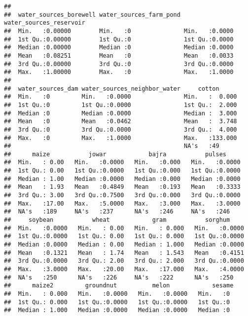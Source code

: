 \documentclass[
]{article}
\begin{document}
\begin{verbatim}
##                                                                               
##  water_sources_borewell water_sources_farm_pond water_sources_reservoir
##  Min.   :0.00000        Min.   :0               Min.   :0.0000         
##  1st Qu.:0.00000        1st Qu.:0               1st Qu.:0.0000         
##  Median :0.00000        Median :0               Median :0.0000         
##  Mean   :0.08251        Mean   :0               Mean   :0.0033         
##  3rd Qu.:0.00000        3rd Qu.:0               3rd Qu.:0.0000         
##  Max.   :1.00000        Max.   :0               Max.   :1.0000         
##                                                                        
##  water_sources_dam water_sources_neighbor_water     cotton       
##  Min.   :0         Min.   :0.0000               Min.   :  0.000  
##  1st Qu.:0         1st Qu.:0.0000               1st Qu.:  2.000  
##  Median :0         Median :0.0000               Median :  3.000  
##  Mean   :0         Mean   :0.0462               Mean   :  3.748  
##  3rd Qu.:0         3rd Qu.:0.0000               3rd Qu.:  4.000  
##  Max.   :0         Max.   :1.0000               Max.   :133.000  
##                                                 NA's   :49       
##      maize           jowar            bajra           pulses      
##  Min.   : 0.00   Min.   :0.0000   Min.   :0.000   Min.   :0.0000  
##  1st Qu.: 0.00   1st Qu.:0.0000   1st Qu.:0.000   1st Qu.:0.0000  
##  Median : 1.00   Median :0.0000   Median :0.000   Median :0.0000  
##  Mean   : 1.93   Mean   :0.4849   Mean   :0.193   Mean   :0.3333  
##  3rd Qu.: 3.00   3rd Qu.:0.7500   3rd Qu.:0.000   3rd Qu.:0.0000  
##  Max.   :17.00   Max.   :5.0000   Max.   :3.000   Max.   :3.0000  
##  NA's   :189     NA's   :237      NA's   :246     NA's   :246     
##     soybean           wheat            gram           sorghum      
##  Min.   :0.0000   Min.   : 0.00   Min.   : 0.000   Min.   :0.0000  
##  1st Qu.:0.0000   1st Qu.: 0.00   1st Qu.: 0.000   1st Qu.:0.0000  
##  Median :0.0000   Median : 0.00   Median : 1.000   Median :0.0000  
##  Mean   :0.1321   Mean   : 1.74   Mean   : 1.543   Mean   :0.4151  
##  3rd Qu.:0.0000   3rd Qu.: 2.00   3rd Qu.: 2.000   3rd Qu.:0.0000  
##  Max.   :3.0000   Max.   :20.00   Max.   :17.000   Max.   :4.0000  
##  NA's   :250      NA's   :226     NA's   :222      NA's   :250     
##      maize2         groundnut          melon            sesame   
##  Min.   : 0.000   Min.   :0.0000   Min.   :0.0000   Min.   :0    
##  1st Qu.: 0.000   1st Qu.:0.0000   1st Qu.:0.0000   1st Qu.:0    
##  Median : 1.000   Median :0.0000   Median :0.0000   Median :0    

\end{verbatim}
\end{document}

